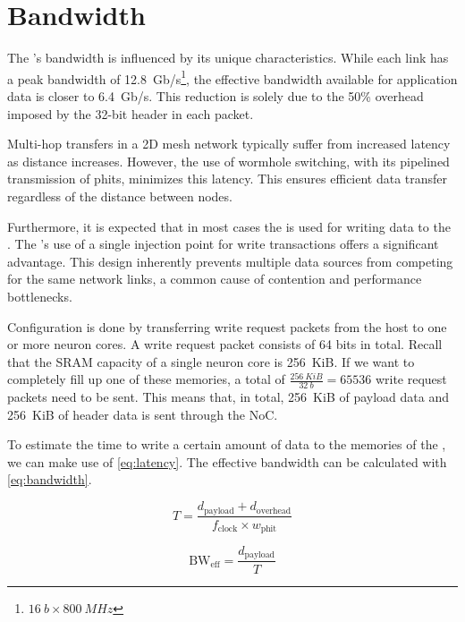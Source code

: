 \section{Bandwidth}
The \confignoc{}'s bandwidth is influenced by its unique characteristics.
While each link has a peak bandwidth of \SI{12.8}{Gb/s}\footnote{$\SI{16}{b} \times \SI{800}{MHz}$}, the effective bandwidth available for application data is closer to \SI{6.4}{Gb/s}.
This reduction is solely due to the 50\% overhead imposed by the 32-bit header in each packet.

Multi-hop transfers in a 2D mesh network typically suffer from increased latency as distance increases.
However, the use of wormhole switching, with its pipelined transmission of phits, minimizes this latency.
This ensures efficient data transfer regardless of the distance between nodes.

Furthermore, it is expected that in most cases the \confignoc{} is used for writing data to the \graicore{}.
The \confignoc{}'s use of a single injection point for write transactions offers a significant advantage.
This design inherently prevents multiple data sources from competing for the same network links, a common cause of contention and performance bottlenecks.

Configuration is done by transferring write request packets from the host to one or more neuron cores.
A write request packet consists of 64 bits in total.
Recall that the SRAM capacity of a single neuron core is \SI{256}{KiB}.
If we want to completely fill up one of these memories, a total of $\frac{\SI{256}{KiB}}{\SI{32}{b}} = \num{65536}$ write request packets need to be sent.
This means that, in total, \SI{256}{KiB} of payload data and \SI{256}{KiB} of header data is sent through the NoC.

To estimate the time to write a certain amount of data to the memories of the \graicore{}, we can make use of \cref{eq:latency}.
The effective bandwidth can be calculated with \cref{eq:bandwidth}.

\begin{equation} \label{eq:latency}
    T = 
    \frac{d_{\text{payload}} + d_{\text{overhead}}}
    {f_{\text{clock}} \times w_{\text{phit}}}
\end{equation}

\begin{equation} \label{eq:bandwidth}
    \text{BW}_{\text{eff}} =
    \frac{d_\text{payload}}{T}
\end{equation}

